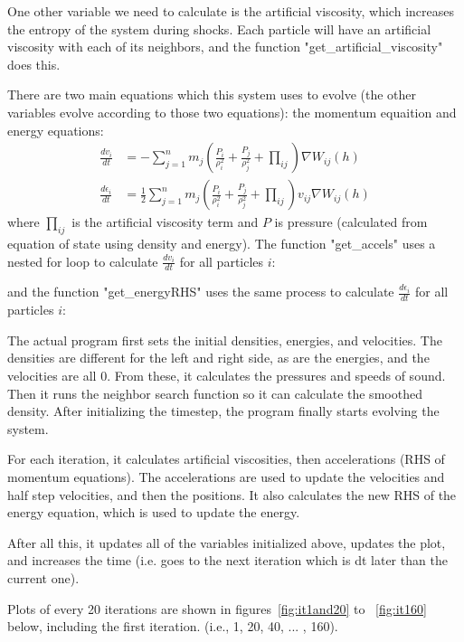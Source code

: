 \documentclass[11pt,letterpaper]{article}
\begin{document}
One other variable we need to calculate is the artificial viscosity, which increases 
the entropy of the system during shocks. Each particle will have an artificial 
viscosity with each of its neighbors, and the function "get\_artificial\_viscosity" 
does this. 

There are two main equations which this system uses to evolve (the other variables 
evolve according to those two equations): the momentum equaition and energy equations:
\begin{align*}
\frac{dv_i}{dt} &= -\sum\limits_{j=1}^n m_j \left(\frac{P_i}{\rho_i^2} + \frac{P_j}{\rho_j^2} + \prod\limits_{ij} \right) \nabla W_{ij}(h) \\
\frac{d\epsilon_i}{dt} &= \frac{1}{2}\sum\limits_{j=1}^n m_j \left(\frac{P_i}{\rho_i^2} + \frac{P_j}{\rho_j^2} + \prod\limits_{ij} \right) v_{ij} \nabla W_{ij}(h) 
\end{align*}
where $\prod\limits_{ij}$ is the artificial viscosity term and $P$ is pressure (calculated
from equation of state using density and energy). The function "get\_accels" uses a nested
for loop to calculate $\frac{dv_i}{dt}$ for all particles $i$:

and the function "get\_energyRHS" uses the same process to calculate $\frac{d\epsilon_i}{dt}$
for all particles $i$:


The actual program first sets the initial densities, energies, and velocities. The densities
are different for the left and right side, as are the energies, and the velocities are all 0.
From these, it calculates the pressures and speeds of sound. Then it runs the neighbor search
function so it can calculate the smoothed density. After initializing the timestep, the
program finally starts evolving the system. 

For each iteration, it calculates artificial 
viscosities, then accelerations (RHS of momentum equations). The accelerations are
used to update the velocities and half step velocities, and then the positions. It also
calculates the new RHS of the energy equation, which is used to update the energy. 

After all this, it updates all of the variables initialized above, updates the plot, and
increases the time (i.e. goes to the next iteration which is dt later than the current one).

Plots of every 20 iterations are shown in figures~\ref{fig:it1and20} to ~\ref{fig:it160} 
below, including the first iteration. (i.e., 1, 20, 40, ... , 160).
\end{document}
